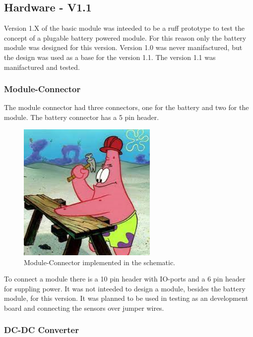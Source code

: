 \subsection{Hardware - V1.1}
    Version 1.X of the basic module was inteeded to be a ruff prototype to test the concept of a 
    plugable battery powered module. For this reason only the battery module was designed for this
    version. Version 1.0 was never manifactured, but the design was used as a base for the
    version 1.1. The version 1.1 was manifactured and tested. 

    \subsubsection{Module-Connector}
        The module connector had three connectors, one for the battery and two for the
        module. The battery connector has a 5 pin header. 

        \begin{figure}[H]
            \centering
            \includegraphics[width=0.6\textwidth]{assets/HW/TBD2.png}
            \caption{Module-Connector implemented in the schematic.}
        \end{figure}


        To connect a module there is a 10 pin header with IO-ports and a 6 pin header 
        for suppling power. It was not inteeded to design a module, besides the battery module,
        for this version. It was planned to be used in testing as an development board and connecting
        the sensors over jumper wires.

    \subsubsection{DC-DC Converter}
        
